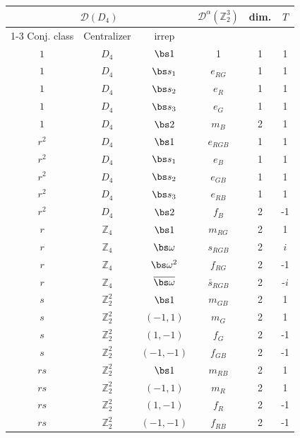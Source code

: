 \documentclass[12pt,a4paper]{standalone}
\def\ZZ{\mathbb Z}
\begin{document}
\begin{table}[h!]
    \centering
        \begin{tabular}{|c|c|c||c||c|c|}
        \hline
 \multicolumn{3}{|c||}{$\mathcal D(D_4)$} & \multirow{2}{*}{$\mathcal D^\alpha(\ZZ_2^3)$} & \multirow{2}{*}{dim.} & \multirow{2}{*}{$T$}\\
 \cline{1-3}
Conj. class & Centralizer & irrep &&  &\\
    \hline
          $1$ &$D_4$ & $\bs 1$  & 1      & 1 & 1\\
      $1$ &$D_4$ &  $\bs s_1$  & $e_{RG}$      & 1  & 1\\
        $1$ &$D_4$ &  $\bs s_2$ & $e_{R}$      & 1 & 1\\
  $1$ &$D_4$ & $\bs s_3$  & $e_{G}$       & 1 & 1\\
        $1$ &$D_4$ & $\bs 2$  & $m_B$       & 2 & 1 \\
\hline
          ${r^2}$ &$D_4$ &$\bs 1$  & $e_{RGB}$   & 1 & 1\\
${r^2}$ &$D_4$ &$\bs s_1$  & $e_{B}$   & 1 & 1\\
     ${r^2}$ &$D_4$ &  $\bs s_2$ &$e_{GB}$    & 1 & 1\\
  ${r^2}$ &$D_4$ &$\bs s_3$ &$e_{RB}$  & 1 & 1\\
      ${r^2}$ &$D_4$ &$\bs 2$  &$f_B$ & 2 & -1\\
\hline
        ${r}$ &$\ZZ_4$ & $\bs 1$ & $m_{RG}$  & 2 & 1\\
             ${r}$ &$\ZZ_4$ & $\bs \omega$ & $ s_{RGB}$  & 2 &$i$\\
   ${r}$ &$\ZZ_4$ & $\bs \omega^2$ & $f_{RG}$  &2 & -1\\
   ${r}$ &$\ZZ_4$ & $\overline{\bs \omega}$ & $\bar s_{RGB}$ & 2 &-$i$\\
\hline
               ${s}$ &$\ZZ_2^2$ & $\bs 1$ &$m_{GB}$ & 2 & 1\\
              ${s}$ &$\ZZ_2^2$ &$(-1,1)$&$m_{G}$ & 2 &1\\
     ${s}$ &$\ZZ_2^2$ & $(1,-1)$ &$f_{G}$& 2 &-1\\
       ${s}$ &$\ZZ_2^2$ & $(-1,-1)$ &$f_{GB}$& 2 &-1 \\
\hline
         ${rs}$ &$\ZZ_2^2$ &$\bs 1$ &$m_{RB}$ & 2 & 1\\
     ${rs}$ &$\ZZ_2^2$ & $(-1,1)$ &$m_{R}$& 2 &1 \\
    ${rs}$ &$\ZZ_2^2$ &$(1,-1)$&$f_{R}$& 2 &-1 \\
 ${rs}$ &$\ZZ_2^2$ & $(-1,-1)$& $f_{RB}$& 2 & -1\\
    \hline
    \end{tabular}
        \label{tab:D4anyons}
    \end{table}
\end{document}
